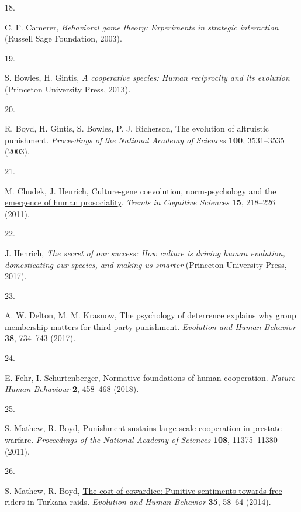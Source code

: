 \documentclass[
  man, donotrepeattitle,floatsintext]{apa6}
\newlength{\cslhangindent}
\newlength{\csllabelwidth}
\newlength{\cslentryspacingunit} %
\newenvironment{CSLReferences}[2] %
 {%
  \setlength{\parindent}{0pt}
  \ifodd #1
  \let\oldpar\par
  \def\par{\hangindent=\cslhangindent\oldpar}
  \fi
  \setlength{\parskip}{#2\cslentryspacingunit}
 }%
 {}
\newcommand{\CSLLeftMargin}[1]{\parbox[t]{\csllabelwidth}{#1}}
\newcommand{\CSLRightInline}[1]{\parbox[t]{\linewidth - \csllabelwidth}{#1}\break}
\begin{document}
\begin{CSLReferences}{0}{0}
\leavevmode{}%
\CSLLeftMargin{18. }%
\CSLRightInline{C. F. Camerer, \emph{Behavioral game theory: Experiments in strategic interaction} (Russell Sage Foundation, 2003).}

\leavevmode{}%
\CSLLeftMargin{19. }%
\CSLRightInline{S. Bowles, H. Gintis, \emph{A cooperative species: Human reciprocity and its evolution} (Princeton University Press, 2013).}

\leavevmode{}%
\CSLLeftMargin{20. }%
\CSLRightInline{R. Boyd, H. Gintis, S. Bowles, P. J. Richerson, The evolution of altruistic punishment. \emph{Proceedings of the National Academy of Sciences} \textbf{100}, 3531--3535 (2003).}

\leavevmode{}%
\CSLLeftMargin{21. }%
\CSLRightInline{M. Chudek, J. Henrich, \href{https://doi.org/10.1016/j.tics.2011.03.003}{Culture-gene coevolution, norm-psychology and the emergence of human prosociality}. \emph{Trends in Cognitive Sciences} \textbf{15}, 218--226 (2011).}

\leavevmode{}%
\CSLLeftMargin{22. }%
\CSLRightInline{J. Henrich, \emph{The secret of our success: How culture is driving human evolution, domesticating our species, and making us smarter} (Princeton University Press, 2017).}

\leavevmode{}%
\CSLLeftMargin{23. }%
\CSLRightInline{A. W. Delton, M. M. Krasnow, \href{https://doi.org/10.1016/j.evolhumbehav.2017.07.003}{The psychology of deterrence explains why group membership matters for third-party punishment}. \emph{Evolution and Human Behavior} \textbf{38}, 734--743 (2017).}

\leavevmode{}%
\CSLLeftMargin{24. }%
\CSLRightInline{E. Fehr, I. Schurtenberger, \href{https://doi.org/10.1038/s41562-018-0385-5}{Normative foundations of human cooperation}. \emph{Nature Human Behaviour} \textbf{2}, 458--468 (2018).}

\leavevmode{}%
\CSLLeftMargin{25. }%
\CSLRightInline{S. Mathew, R. Boyd, Punishment sustains large-scale cooperation in prestate warfare. \emph{Proceedings of the National Academy of Sciences} \textbf{108}, 11375--11380 (2011).}

\leavevmode{}%
\CSLLeftMargin{26. }%
\CSLRightInline{S. Mathew, R. Boyd, \href{https://doi.org/10.1016/j.evolhumbehav.2013.10.001}{The cost of cowardice: Punitive sentiments towards free riders in {Turkana} raids}. \emph{Evolution and Human Behavior} \textbf{35}, 58--64 (2014).}


\end{CSLReferences}
\end{document}
